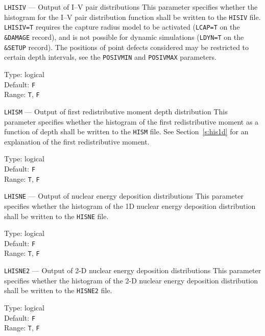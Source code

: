 \begin{keydescription}{\texttt{LHISIV} --- Output of I--V pair distributions}
%
  This parameter specifies whether the histogram for the I--V pair distribution function shall 
  be written to the \texttt{HISIV} file. \texttt{LHISIV=T} requires the capture radius model to 
  be activated (\texttt{LCAP=T} on the \texttt{\&DAMAGE} record), and is not possible for 
  dynamic simulations (\texttt{LDYN=T} on the \texttt{\&SETUP} record). The positions of point 
  defects considered may be restricted to certain depth intervals, see the
  \texttt{POSIVMIN} and \texttt{POSIVMAX} parameters.
  \begin{keytab}
    Type:    \> logical \\
    Default: \> \texttt{F} \\
    Range:   \> \texttt{T}, \texttt{F} 
  \end{keytab}
\end{keydescription}

\begin{keydescription}{\texttt{LHISM} --- Output of first redistributive moment depth
    distribution}
%
  This parameter specifies whether the histogram of the first redistributive moment as a 
  function of depth shall be written to the \texttt{HISM} file. See Section~\ref{s:his1d} for 
  an explanation of the first redistributive moment. 
  \begin{keytab}
    Type:    \> logical \\
    Default: \> \texttt{F} \\
    Range:   \> \texttt{T}, \texttt{F} 
  \end{keytab}
\end{keydescription}

\begin{keydescription}{\texttt{LHISNE} --- Output of nuclear energy deposition distributions}
%
  This parameter specifies whether the histogram of the 1D nuclear energy
  deposition distribution shall be written to the \texttt{HISNE} file.
  \begin{keytab}
    Type:    \> logical \\
    Default: \> \texttt{F} \\
    Range:   \> \texttt{T}, \texttt{F} 
  \end{keytab}
\end{keydescription}

\begin{keydescription}{\texttt{LHISNE2} --- Output of 2-D nuclear energy deposition distributions}
%
  This parameter specifies whether the histogram of the 2-D nuclear energy
  deposition distribution shall be written to the \texttt{HISNE2} file.
  \begin{keytab}
    Type:    \> logical \\
    Default: \> \texttt{F} \\
    Range:   \> \texttt{T}, \texttt{F} 
  \end{keytab}
\end{keydescription}

